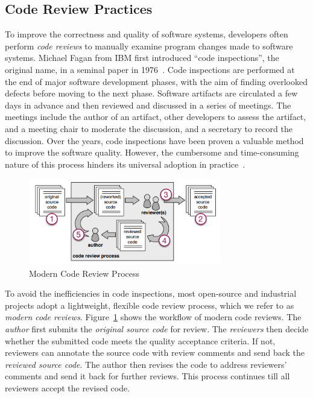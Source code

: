 \documentclass[runningheads,a4paper]{llncs}
\begin{document}
\subsection{Code Review Practices}
To improve the correctness and quality of software systems, developers often perform {\em code reviews} to manually examine program changes made to software systems. Michael Fagan from IBM first introduced ``code inspections'', the original name, in a seminal paper in 1976~\cite{fagan2001design}. Code inspections are performed at the end of major software development phases, with the aim of finding overlooked defects before moving to the next phase. Software artifacts are circulated a few days in advance and then reviewed and discussed in a series of meetings. The meetings include the author of an artifact, other developers to assess the artifact, and a meeting chair to moderate the discussion, and a secretary to record the discussion. Over the years, code inspections have been proven a valuable method to improve the software quality. However, the cumbersome and time-consuming nature of this process hinders its universal adoption in practice~\cite{johnson1998reengineering}. 

\begin{figure}[ht]
 \centering
 \includegraphics[width=0.75\textwidth]{images/review-process.png}
 \caption{Modern Code Review Process~\cite{beller2014modern}}
 \label{fig:review-process}
\end{figure}

To avoid the inefficiencies in code inspections, most open-source and industrial projects adopt a lightweight, flexible code review process, which we refer to as {\em modern code reviews}. Figure~\ref{fig:review-process} shows the workflow of modern code reviews. The {\em author} first submits the {\em original source code} for review. The {\em reviewers} then decide whether the submitted code meets the quality acceptance criteria. If not, reviewers can annotate the source code with review comments and send back the {\em reviewed source code}. The author then revises the code to address reviewers' comments and send it back for further reviews. This process continues till all reviewers accept the revised code.
\end{document}
